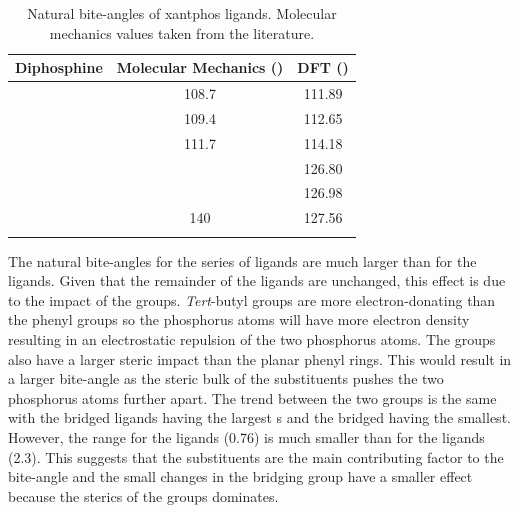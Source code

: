 
\begin{table}[ht]
\small
\caption[Natural bite-angles of xantphos ligands]{Natural bite-angles of xantphos ligands.  Molecular mechanics values taken from the literature.\cite{Kranenburg1995}}
\label{table:biteanglescalculated}
\begin{center}
\begin{tabular}{l c c}
	\toprule
	\bfseries{Diphosphine}	&\bfseries{Molecular Mechanics (\degrees)}&\bfseries{DFT (\degrees)}\\
	\midrule		
	\PhSixantphos		&108.7	&111.89	\\
	\PhThixantphos		&109.4	&112.65	\\
	\PhXantphos		&111.7	&114.18	\\	
	\tBuSixantphos		&		&126.80	\\
	\tBuThixantphos	&		&126.98	\\
	\tBuXantphos		&140		&127.56	\\
	\bottomrule{}
\end{tabular}
\end{center}
\end{table}


The natural bite-angles for the \tBuxantphos{} series of ligands are much larger than for the \Phxantphos{} ligands.  Given that the remainder of the ligands are unchanged, this effect is due to the impact of the \tBu{} groups.  \emph{Tert}-butyl groups are more electron-donating than the phenyl groups so the phosphorus atoms will have more electron density resulting in an electrostatic repulsion of the two phosphorus atoms.  The \tBu{} groups also have a larger steric impact than the planar phenyl rings.  This would result in a larger bite-angle as the steric bulk of the \tBu{} substituents pushes the two phosphorus atoms further apart.  The trend between the two groups is the same with the  bridged ligands having the largest \biteangle{}s and the  bridged having the smallest.  However, the range for the \tBuxantphos{} ligands (0.76\degrees{}) is much smaller than for the \Phxantphos{} ligands (2.3\degrees{}).  This suggests that the \tBu{} substituents are the main contributing factor to the bite-angle and the small changes in the bridging group have a smaller effect because the sterics of the \tBu{} groups dominates.  

